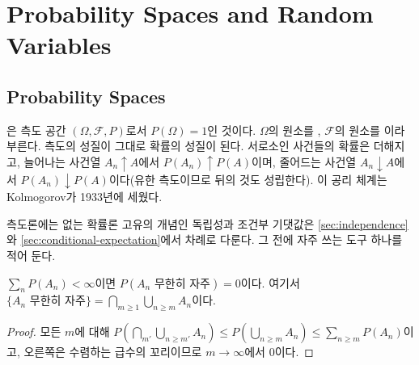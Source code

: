 \chapter{Probability Spaces and Random Variables}
\label{ch:probability-spaces}


\section{Probability Spaces}
\label{sec:probability-space}

은 측도 공간 $(\Omega,\mathcal F,P)$로서 $P(\Omega)=1$인 것이다. $\Omega$의 원소를 , $\mathcal F$의 원소를 이라 부른다. 측도의 성질이 그대로 확률의 성질이 된다. 서로소인 사건들의 확률은 더해지고, 늘어나는 사건열 $A_n\uparrow A$에서 $P(A_n)\uparrow P(A)$이며, 줄어드는 사건열 $A_n\downarrow A$에서 $P(A_n)\downarrow P(A)$이다(유한 측도이므로 뒤의 것도 성립한다). 이 공리 체계는 Kolmogorov가 1933년에 세웠다\cite{kolmogorov1933}.

측도론에는 없는 확률론 고유의 개념인 독립성과 조건부 기댓값은 \cref{sec:independence}와 \cref{sec:conditional-expectation}에서 차례로 다룬다. 그 전에 자주 쓰는 도구 하나를 적어 둔다.

\begin{lemma}
\label{lem:borel-cantelli}
$\sum_nP(A_n)<\infty$이면 $P(A_n\text{ 무한히 자주})=0$이다. 여기서 $\{A_n\text{ 무한히 자주}\}=\bigcap_{m\ge1}\bigcup_{n\ge m}A_n$이다.
\end{lemma}

\begin{proof}
모든 $m$에 대해 $P(\bigcap_{m'}\bigcup_{n\ge m'}A_n)\le P(\bigcup_{n\ge m}A_n)\le\sum_{n\ge m}P(A_n)$이고, 오른쪽은 수렴하는 급수의 꼬리이므로 $m\to\infty$에서 $0$이다.
\end{proof}

